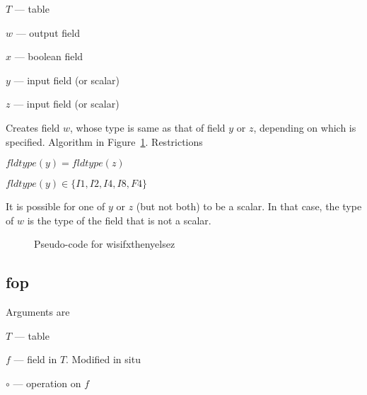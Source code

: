 \be
\item \(T\) --- table
\item \(w\) --- output field 
\item \(x\) --- boolean field 
\item \(y\) --- input field (or scalar)
\item \(z\) --- input field (or scalar)
\ee

Creates field \(w\), whose type is same as that of field \(y\) or \(z\),
depending on which is specified. 
Algorithm in Figure~\ref{pseudo_code_wisifxthenyelsez}. Restrictions
\be
\item \(fldtype(y) = fldtype(z)\)
\item \(fldtype(y) \in \{I1, I2, I4, I8, F4\}\)
\item It is possible for one of \(y\) or \(z\) (but not both) to be a scalar.
In that case, the type of \(w\) is the type of the field that is not a
scalar. 
\ee

\begin{figure}
\centering
{}
\label{pseudo_code_wisifxthenyelsez}
\caption{Pseudo-code for wisifxthenyelsez}
\end{figure}



\subsection{fop}
\label{fop}
Arguments are 
\be
\item \(T\) --- table
\item \(f\) --- field in \(T\). Modified in situ
\item \(\circ\)  --- operation on \(f\) 
\ee

